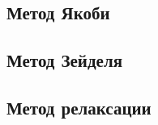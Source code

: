 \documentclass[12pt, a4paper]{article}
\begin{document}
	\subsection{Метод Якоби}
			
	\subsection{Метод Зейделя}

	\subsection{Метод релаксации}	
	
\end{document}
